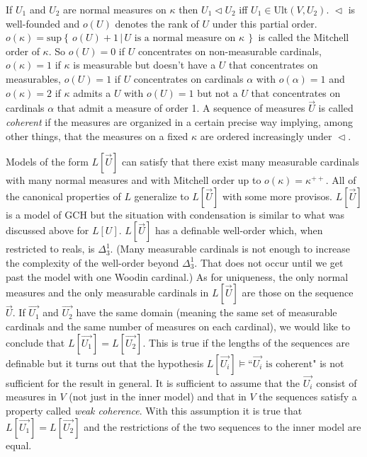 \documentclass[oneside,12pt]{amsart}
\begin{document}
If $U_1$ and $U_2$ are normal measures on $\kappa$ then $U_1 \vartriangleleft U_2$ iff
$U_1 \in \text{Ult}(V, U_2)$. $\vartriangleleft$ is well-founded and $o(U)$ denotes the
rank of $U$ under this partial order. $o(\kappa) = \text{sup}
\left\{ \, o(U) + 1 \, \left| \, U \text{ is a normal measure on } \kappa \, \right.\right\}$
is called
the Mitchell order of $\kappa$. So  $o(U) = 0$ if $U$
concentrates on non-measurable cardinals, $o(\kappa) = 1$ if $\kappa$ is measurable
but doesn't have a $U$ that concentrates on measurables, $o(U) = 1$ if $U$
concentrates on cardinals $\alpha$ with $o(\alpha) = 1$ and $o(\kappa) = 2$ if
$\kappa$ admits a $U$ with $o(U) = 1$ but not a $U$ that concentrates on cardinals
$\alpha$ that admit a measure of order 1. A sequence of measures $\vec{U}$ is
called \emph{coherent} if the measures are organized in a certain precise way
implying, among other things, that the measures on a fixed $\kappa$ are ordered
increasingly under $\vartriangleleft$.

Models of the form $L[\vec{U}]$ can satisfy
that there exist many measurable cardinals with many normal measures and
with Mitchell order up to $o(\kappa)=\kappa^{++}$. All of the canonical properties
of $L$ generalize to $L[\vec{U}]$ with some more provisos.
$L[\vec{U}]$ is a model of GCH but the situation with condensation is similar
to what was discussed above for $L[U]$. $L[\vec{U}]$ has a definable well-order
which, when restricted to reals, is $\Delta^1_3$. (Many measurable cardinals is
not enough to increase the complexity of the well-order beyond $\Delta^1_3$. That
does not occur until we get past the model with one Woodin cardinal.) As for uniqueness,
the only normal measures and the only measurable cardinals in $L[\vec{U}]$ are
those on the sequence $\vec{U}$. If $\vec{U_1}$ and $\vec{U_2}$ have the same
domain (meaning the same set of measurable cardinals and the same number
of measures on each cardinal), we would like to conclude that
$L[\vec{U_1}] = L[\vec{U_2}]$. This is true if the lengths of the sequences
are definable but it turns out that the hypothesis
$L[\vec{U_i}]\models \text{``}\vec{U_i} \text{ is coherent"}$
is not sufficient for the result in general. It is sufficient to assume that the $\vec{U_i}$ consist
of measures in $V$ (not just in the inner model) and that in $V$ the sequences satisfy a property called
\emph{weak coherence}. With this assumption it is true that $L[\vec{U_1}] = L[\vec{U_2}]$
and the restrictions of the two sequences to the inner model are equal.
\end{document}
